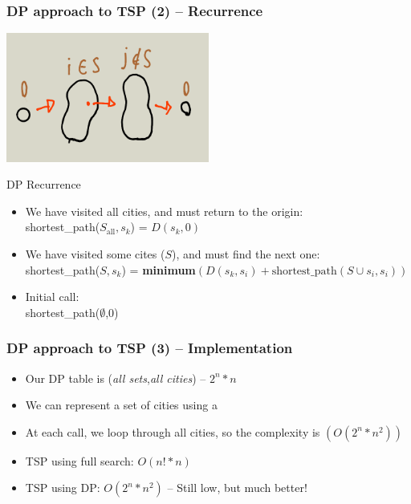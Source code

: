 \documentclass{beamer}
\begin{document}
\begin{frame}
  \frametitle{DP approach to TSP (2) -- Recurrence}

  {\smaller
    \begin{center}
      \includegraphics[width=0.5\textwidth]{img/DP_TSP}
    \end{center}
    \begin{block}{DP Recurrence}
      \begin{itemize}
      \item We have visited all cities, and must return to the origin:\\
        shortest\_path($S_{\text{all}},s_k$) = $D(s_k,0)$
      \item We have visited some cites ($S$), and must find the next one:\\
        shortest\_path($S,s_k$) = {\bf minimum}$(D(s_k,s_i) + \text{shortest\_path}(S\cup s_i,s_i))$
      \item Initial call:\\
        shortest\_path($\emptyset$,0)
      \end{itemize}
    \end{block}
  }
\end{frame}

\begin{frame}
  \frametitle{DP approach to TSP (3) -- Implementation}

  {\smaller
    \begin{exampleblock}{}
      \begin{itemize}
      \item Our DP table is (\emph{all sets},\emph{all cities}) -- $2^n * n$
      \item We can represent a set of cities using a 
      \item At each call, we loop through all cities, so the complexity is $(O(2^n*n^2))$

        \bigskip

      \item TSP using full search: $O(n!*n)$
      \item TSP using DP: $O(2^n*n^2)$ -- Still low, but much better!        
      \end{itemize}
    \end{exampleblock}
  }
\end{frame}
\end{document}
